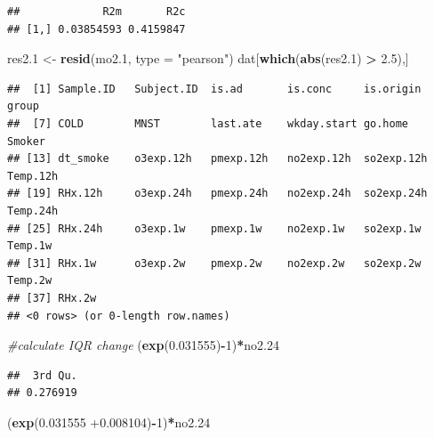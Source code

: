 \documentclass[12pt,]{article}
\newenvironment{Shaded}{\begin{snugshade}}{\end{snugshade}}
\newcommand{\CommentTok}[1]{\textcolor[rgb]{0.56,0.35,0.01}{\textit{#1}}}
\newcommand{\DataTypeTok}[1]{\textcolor[rgb]{0.13,0.29,0.53}{#1}}
\newcommand{\DecValTok}[1]{\textcolor[rgb]{0.00,0.00,0.81}{#1}}
\newcommand{\FloatTok}[1]{\textcolor[rgb]{0.00,0.00,0.81}{#1}}
\newcommand{\KeywordTok}[1]{\textcolor[rgb]{0.13,0.29,0.53}{\textbf{#1}}}
\newcommand{\NormalTok}[1]{#1}
\newcommand{\OperatorTok}[1]{\textcolor[rgb]{0.81,0.36,0.00}{\textbf{#1}}}
\newcommand{\StringTok}[1]{\textcolor[rgb]{0.31,0.60,0.02}{#1}}
\begin{document}
\begin{verbatim}
##             R2m       R2c
## [1,] 0.03854593 0.4159847
\end{verbatim}

\begin{Shaded}
\begin{Highlighting}[]
\NormalTok{res2}\FloatTok{.1}\NormalTok{ <-}\StringTok{ }\KeywordTok{resid}\NormalTok{(mo2}\FloatTok{.1}\NormalTok{, }\DataTypeTok{type =} \StringTok{"pearson"}\NormalTok{)}
\NormalTok{dat[}\KeywordTok{which}\NormalTok{(}\KeywordTok{abs}\NormalTok{(res2}\FloatTok{.1}\NormalTok{) }\OperatorTok{>}\StringTok{ }\FloatTok{2.5}\NormalTok{),]}
\end{Highlighting}
\end{Shaded}

\begin{verbatim}
##  [1] Sample.ID   Subject.ID  is.ad       is.conc     is.origin   group      
##  [7] COLD        MNST        last.ate    wkday.start go.home     Smoker     
## [13] dt_smoke    o3exp.12h   pmexp.12h   no2exp.12h  so2exp.12h  Temp.12h   
## [19] RHx.12h     o3exp.24h   pmexp.24h   no2exp.24h  so2exp.24h  Temp.24h   
## [25] RHx.24h     o3exp.1w    pmexp.1w    no2exp.1w   so2exp.1w   Temp.1w    
## [31] RHx.1w      o3exp.2w    pmexp.2w    no2exp.2w   so2exp.2w   Temp.2w    
## [37] RHx.2w     
## <0 rows> (or 0-length row.names)
\end{verbatim}

\begin{Shaded}
\begin{Highlighting}[]
\CommentTok{#calculate IQR change}
\NormalTok{(}\KeywordTok{exp}\NormalTok{(}\FloatTok{0.031555}\NormalTok{)}\OperatorTok{-}\DecValTok{1}\NormalTok{)}\OperatorTok{*}\NormalTok{no2}\FloatTok{.24}
\end{Highlighting}
\end{Shaded}

\begin{verbatim}
##  3rd Qu. 
## 0.276919
\end{verbatim}

\begin{Shaded}
\begin{Highlighting}[]
\NormalTok{(}\KeywordTok{exp}\NormalTok{(}\FloatTok{0.031555} \FloatTok{+0.008104}\NormalTok{)}\OperatorTok{-}\DecValTok{1}\NormalTok{)}\OperatorTok{*}\NormalTok{no2}\FloatTok{.24}
\end{Highlighting}
\end{Shaded}
\end{document}
